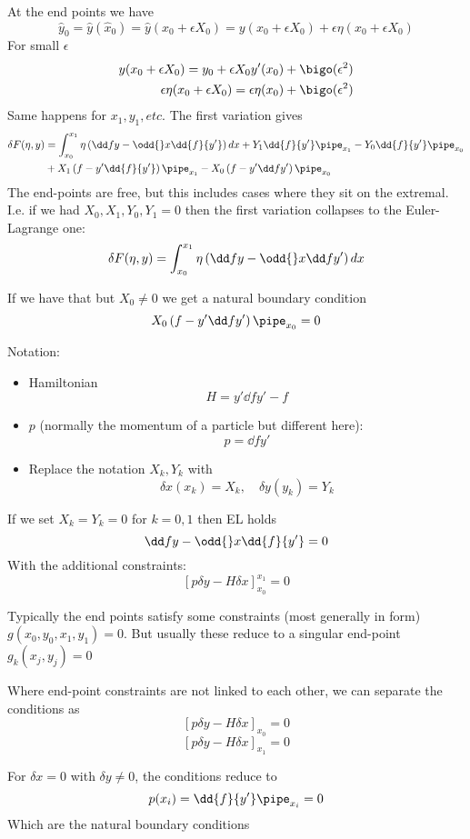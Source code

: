 \documentclass{E:/Documents/Latex/myassignment}
\begin{document}
At the end points we have
\[\hat{y}_0 = \hat{y}(\hat{x}_0) = \hat{y}(x_0+\epsilon X_0) = y(x_0+ \epsilon X_0) + \epsilon \eta (x_0+ \epsilon X_0)\]
For small $\epsilon$
\begin{align*}
	y(x_0 + \epsilon X_0) = y_0 + \epsilon X_0 y'(x_0) + \bigo(\epsilon^2)\\
	\epsilon \eta (x_0 + \epsilon X_0) = \epsilon \eta (x_0) + \bigo(\epsilon^2)
\end{align*}
Same happens for $x_1,y_1,etc.$
The first variation gives
\begin{align*}
	\delta F(\eta,y) &= \int_{x_0}^{x_1} \eta \left(\dd fy - \odd{}x \dd {f}{y'}\right)dx + Y_1 \dd{f}{y'}\pipe_{x_1} - Y_0 \dd{f}{y'}\pipe_{x_0}\\
	& + X_1 \left(f - y' \dd{f}{y'}\right)\pipe_{x_1} - X_0 \left(f - y' \dd f{y'}\right)\pipe_{x_0}
\end{align*}
The end-points are free, but this includes cases where they sit on the extremal.
I.e. if we had $X_0,X_1,Y_0,Y_1 = 0$ then the first variation collapses to the Euler-Lagrange one:
\[\delta F(\eta,y) = \int_{x_0}^{x_1} \eta \left(\dd fy - \odd{}x \dd f{y'}\right) dx\]

If we have that but $X_0 \neq 0$ we get a natural boundary condition
\[X_0 \left(f - y' \dd f{y'}\right)\pipe_{x_0} = 0\]

Notation:
\begin{itemize}
	\item Hamiltonian
	\[H = y' \dd f{y'} - f\]
	\item $p$ (normally the momentum of a particle but different here):
	\[p = \dd f{y'}\]
	\item Replace the notation $X_k,Y_k$ with
	\[\delta x(x_k) = X_k, \quad \delta y(y_k) = Y_k\]
\end{itemize}


If we set $X_k=Y_k = 0$ for $k=0,1$ then EL holds
\[\dd fy - \odd{}x \dd{f}{y'} = 0\]
With the additional constraints:
\[\left[p \delta y - H \delta x\right]_{x_0}^{x_1} = 0\]

Typically the end points satisfy some constraints (most generally in form) $g(x_0,y_0,x_1,y_1) = 0$. But usually these reduce to a singular end-point $g_k(x_j,y_j) = 0$

Where end-point constraints are not linked to each other, we can separate the conditions as
\[\left[p \delta y - H \delta x\right]_{x_0} = 0\]
\[\left[p \delta y - H \delta x\right]_{x_1} = 0\]

For $\delta x = 0$ with $\delta y \neq 0$, the conditions reduce to
\[p(x_i) = \dd{f}{y'} \pipe_{x_i} = 0\]
Which are the natural boundary conditions 
\end{document}
